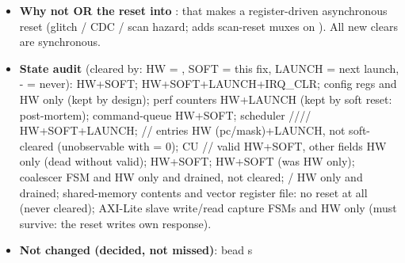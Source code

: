 \begin{record}
\begin{itemize}
   (same clock edge as  -\textgreater{}
  ERROR), so the existing gates (scheduler ,
  coalescer , shared-memory /)
  and the fetch-AR-stuck guard apply unchanged;  stays
  low so  does not fire, and the GPU sits quiescent in
  ERROR until , which finds  already up.
  One changed line of RTL logic, no new state. STATUS still reads ERROR;
  config, perf counters and the (absent) error IRQ are unchanged.
  Finding: in this pipeline a coalescer burst or shared-memory access
  can \textbf{not} be in flight at ERROR entry (the erroring branch
  executes only with the memory units idle and the next instruction is
  never in ID/EX on that edge; measured over 88 divergence cases, only a
  fetch ever is), so the in-flight-burst case is covered by forcing the
  sticky  flop at 100 offsets mid-traffic.
\item
  \textbf{Why not OR the reset into }: that makes a
  register-driven asynchronous reset (glitch / CDC / scan hazard;  adds scan-reset muxes on ). All new
  clears are synchronous.
\item
  \textbf{State audit} (cleared by: HW = , SOFT = this fix,
  LAUNCH = next launch, - = never):  HW+SOFT;
   HW+SOFT+LAUNCH+IRQ\_\allowbreak{}CLR; 
  config regs and  HW only (kept by design); perf
  counters HW+LAUNCH (kept by soft reset: post-mortem); command-queue
   HW+SOFT; scheduler
  ////
  HW+SOFT+LAUNCH; //
  entries HW (pc/\allowbreak{}mask)+LAUNCH, not soft-cleared
  (unobservable with  = 0); CU
  // valid HW+SOFT, other
  fields HW only (dead without valid);  HW+SOFT;
   HW+SOFT (was HW only); coalescer FSM and
   HW only and drained, not cleared;
   / HW only and
  drained; shared-memory contents and vector register file: no reset at
  all (never cleared); AXI-Lite slave write/\allowbreak{}read capture
  FSMs and  HW only (must survive: the reset
  write\textquotesingle s own response).
\item
  \textbf{Not changed (decided, not missed)}: bead
  \textquotesingle s

\end{itemize}
\end{record}
